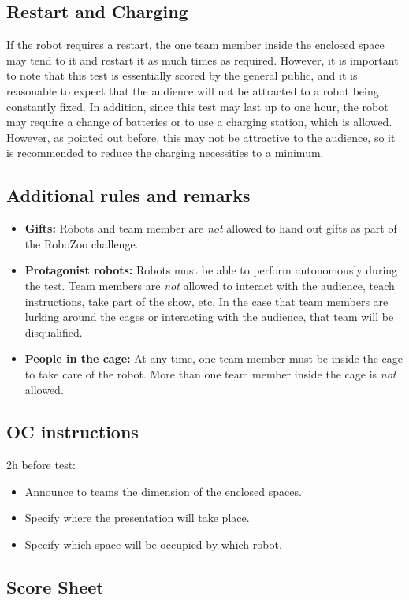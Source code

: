 \subsection{Restart and Charging}
If the robot requires a restart, the one team member inside the enclosed space may tend to it and restart it as much times as required. 
However, it is important to note that this test is essentially scored by the general public, and it is reasonable to expect that the audience will not be attracted to a robot being constantly fixed. 
In addition, since this test may last up to one hour, the robot may require a change of batteries or to use a charging station, which is allowed. 
However, as pointed out before, this may not be attractive to the audience, so it is recommended to reduce the charging necessities to a minimum. 

\subsection{Additional rules and remarks}

\begin{itemize}
\item \textbf{Gifts:} Robots and team member are \emph{not} allowed to hand out gifts as part of the RoboZoo challenge. 
\item \textbf{Protagonist robots:} Robots must be able to perform autonomously during the test. 
Team members are \emph{not} allowed to interact with the audience, teach instructions, take part of the show, etc. 
In the case that team members are lurking around the cages or interacting with the audience, that team will be disqualified.
\item \textbf{People in the cage:} At any time, one team member must be inside the cage to take care of the robot. 
More than one team member inside the cage is \emph{not} allowed.
\end{itemize}

\subsection{OC instructions}

2h before test:
\begin{itemize}
\item{Announce to teams the dimension of the enclosed spaces.}
\item{Specify where the presentation will take place.}
\item{Specify which space will be occupied by which robot.}
\end{itemize}

\subsection{Score Sheet}



